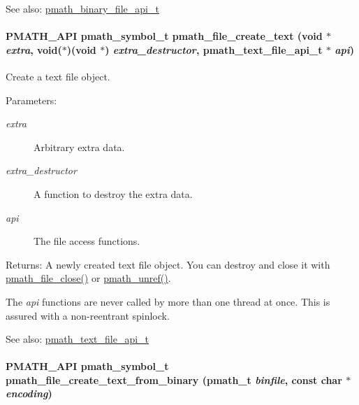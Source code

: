 \begin{Desc}
\item[See also:]\hyperlink{structpmath__binary__file__api__t}{pmath\_\-binary\_\-file\_\-api\_\-t} \end{Desc}
\hypertarget{group__file__api_gb8a4394b083543a3e572862d567b4b63}{
\paragraph[{pmath\_\-file\_\-create\_\-text}]{\setlength{\rightskip}{0pt plus 5cm}PMATH\_\-API {\bf pmath\_\-symbol\_\-t} pmath\_\-file\_\-create\_\-text (void $\ast$ {\em extra}, \/  void($\ast$)(void $\ast$) {\em extra\_\-destructor}, \/  {\bf pmath\_\-text\_\-file\_\-api\_\-t} $\ast$ {\em api})}\hfill}
\label{group__file__api_gb8a4394b083543a3e572862d567b4b63}


Create a text file object. 

\begin{Desc}
\item[Parameters:]
\begin{description}
\item[{\em extra}]Arbitrary extra data. \item[{\em extra\_\-destructor}]A function to destroy the extra data. \item[{\em api}]The file access functions. \end{description}
\end{Desc}
\begin{Desc}
\item[Returns:]A newly created text file object. You can destroy and close it with \hyperlink{group__file__api_g61142920bd7a8f066af908092c84d8e4}{pmath\_\-file\_\-close()} or \hyperlink{classpmath__t_54e905402c38940687033b87eb8c6c9f}{pmath\_\-unref()}.\end{Desc}
The {\em api\/} functions are never called by more than one thread at once. This is assured with a non-reentrant spinlock.

\begin{Desc}
\item[See also:]\hyperlink{structpmath__text__file__api__t}{pmath\_\-text\_\-file\_\-api\_\-t} \end{Desc}
\hypertarget{group__file__api_gc6f1960c7c529c1dac9feb97cf795a1c}{
\paragraph[{pmath\_\-file\_\-create\_\-text\_\-from\_\-binary}]{\setlength{\rightskip}{0pt plus 5cm}PMATH\_\-API {\bf pmath\_\-symbol\_\-t} pmath\_\-file\_\-create\_\-text\_\-from\_\-binary ({\bf pmath\_\-t} {\em binfile}, \/  const char $\ast$ {\em encoding})}\hfill}
\label{group__file__api_gc6f1960c7c529c1dac9feb97cf795a1c}


